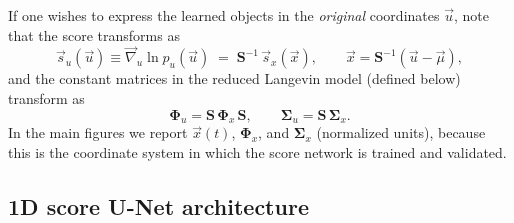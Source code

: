 \documentclass[%
  prl,
  reprint,
  amsmath,
  amssymb,
  aps
]{revtex4-2}
\newcommand{\vvec}[1]{\vec{#1}}
\begin{document}
If one wishes to express the learned objects in the \emph{original} coordinates $\vvec{u}$, note that the score transforms as
\begin{equation}
\vvec{s}_{u}(\vvec{u})\equiv \vvec{\nabla}_{u}\ln p_{u}(\vvec{u})
\;=\;\bm{S}^{-1}\,\vvec{s}_{x}(\vvec{x}),
\qquad \vvec{x}=\bm{S}^{-1}(\vvec{u}-\vvec{\mu}),
\label{eq:score_change_of_variables}
\end{equation}
and the constant matrices in the reduced Langevin model (defined below) transform as
\begin{equation}
\bm{\Phi}_{u}=\bm{S}\,\bm{\Phi}_{x}\,\bm{S},
\qquad
\bm{\Sigma}_{u}=\bm{S}\,\bm{\Sigma}_{x}.
\label{eq:PhiSigma_change_of_variables}
\end{equation}
In the main figures we report $\vvec{x}(t)$, $\bm{\Phi}_x$, and $\bm{\Sigma}_x$ (normalized units), because this is the coordinate system in which the score network is trained and validated.

\subsection{1D score U-Net architecture}
\label{sec:ks_unet_arch}
\end{document}
